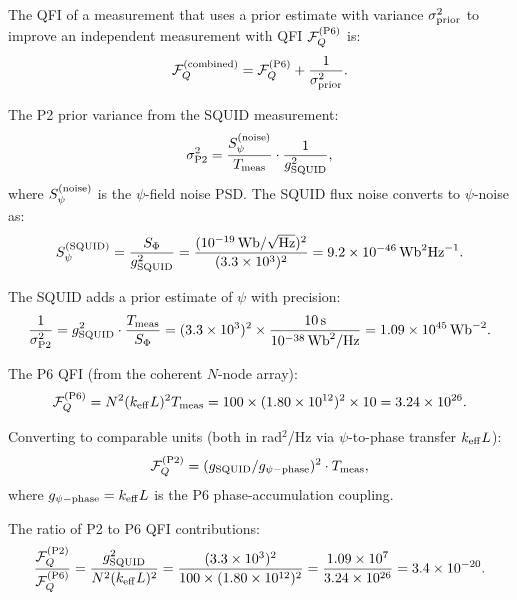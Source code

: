 \documentclass[11pt]{article}
\theoremstyle{definition}
\theoremstyle{remark}
\begin{document}
The QFI of a measurement that uses a prior estimate with variance
$\sigma_{\rm prior}^2$ to improve an independent measurement with QFI
$\mathcal{F}_Q^{(\rm P6)}$ is:
\begin{equation}
\mathcal{F}_Q^{(\rm combined)} = \mathcal{F}_Q^{(\rm P6)} + \frac{1}{\sigma_{\rm prior}^2}.
\label{eq:combined-qfi}
\end{equation}

The P2 prior variance from the SQUID measurement:
\begin{equation}
\sigma_{\rm P2}^2 = \frac{S_\psi^{(\rm noise)}}{T_{\rm meas}} \cdot \frac{1}{g_{\rm SQUID}^2},
\end{equation}
where $S_\psi^{(\rm noise)}$ is the $\psi$-field noise PSD. The SQUID flux noise
converts to $\psi$-noise as:
\begin{equation}
S_\psi^{(\rm SQUID)} = \frac{S_\Phi}{g_{\rm SQUID}^2}
= \frac{(10^{-19}\,\mathrm{Wb}/\sqrt{\rm Hz})^2}{(3.3\times10^3)^2}
= 9.2\times10^{-46}\,\mathrm{Wb}^2\mathrm{Hz}^{-1}.
\end{equation}

The SQUID adds a prior estimate of $\psi$ with precision:
\begin{equation}
\frac{1}{\sigma_{\rm P2}^2} = g_{\rm SQUID}^2 \cdot \frac{T_{\rm meas}}{S_\Phi}
= (3.3\times10^3)^2 \times \frac{10\,\mathrm{s}}{10^{-38}\,\mathrm{Wb}^2/\mathrm{Hz}}
= 1.09\times10^{45}\,\mathrm{Wb}^{-2}.
\end{equation}

The P6 QFI (from the coherent $N$-node array):
\begin{equation}
\mathcal{F}_Q^{(\rm P6)} = N^2 (k_{\rm eff} L)^2 T_{\rm meas}
= 100 \times (1.80\times10^{12})^2 \times 10
= 3.24\times10^{26}.
\end{equation}

Converting to comparable units (both in rad$^2$/Hz via $\psi$-to-phase
transfer $k_{\rm eff} L$):
\begin{equation}
\mathcal{F}_Q^{(\rm P2)} = (g_{\rm SQUID} / g_{\psi-\rm phase})^2 \cdot T_{\rm meas},
\end{equation}
where $g_{\psi-\rm phase} = k_{\rm eff} L$ is the P6 phase-accumulation coupling.

The ratio of P2 to P6 QFI contributions:
\begin{equation}
\frac{\mathcal{F}_Q^{(\rm P2)}}{\mathcal{F}_Q^{(\rm P6)}}
= \frac{g_{\rm SQUID}^2}{N^2 (k_{\rm eff} L)^2}
= \frac{(3.3\times10^3)^2}{100 \times (1.80\times10^{12})^2}
= \frac{1.09\times10^7}{3.24\times10^{26}}
= 3.4\times10^{-20}.
\end{equation}
\end{document}
